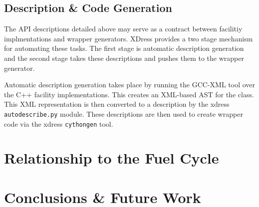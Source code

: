 \documentclass{ansconfpaper}
\newcommand{\vin}[1]{\texttt{{#1}}}
\begin{document}
\subsection{Description \& Code Generation}
\label{sec:autodesc}

The API descriptions detailed above may serve as a contract between facilitiy 
implmentations and wrapper generators.  XDress provides a two stage mechanism 
for automating these tasks.  The first stage is automatic description generation 
and the second stage takes these descriptions and pushes them to the wrapper 
generator.  

Automatic description generation takes place by running the GCC-XML
tool \cite{gccxml} over the C++ facility implementations.  This creates an XML-based
AST for the class.  This XML representation \cite{xml} is then converted to a 
description by the xdress \vin{autodescribe.py} module.  These descriptions are
then used to create wrapper code via the xdress \vin{cythongen} tool.


\section{Relationship to the Fuel Cycle}
\label{sec:fc}

\section{Conclusions \& Future Work}
\label{sec:conc}

\setlength{\baselineskip}{12pt}



\end{document}
